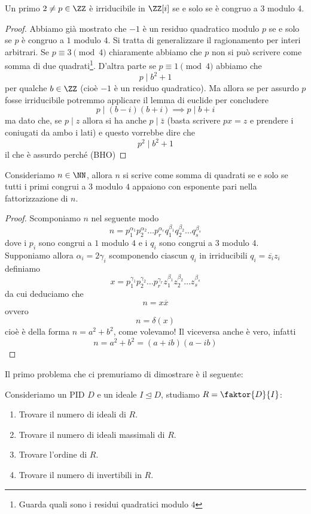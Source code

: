 \documentclass[11pt]{scrartcl}
\newcommand{\normal}{\mathrel{\unlhd}}
\begin{document}
	\begin{proposition}
		Un primo $2\ne p\in\ZZ$ è irriducibile in $\ZZ[i]$ se e solo se è congruo a $3$ modulo $4$.
	\end{proposition}
	\begin{proof}
		Abbiamo già mostrato che $-1$ è un residuo quadratico modulo $p$ se e solo se $p$ è congruo a $1$ modulo $4$. Si tratta di generalizzare il ragionamento per interi arbitrari. Se $p\equiv 3 \pmod{4}$ chiaramente abbiamo che $p$ non si può scrivere come somma di due quadrati\footnote{Guarda quali sono i residui quadratici modulo $4$}. D'altra parte se $p\equiv 1 \pmod{4}$ abbiamo che
		$$p\mid b^2+1$$
		per qualche $b\in\ZZ$ (cioè $-1$ è un residuo quadratico). Ma allora se per assurdo $p$ fosse irriducibile potremmo applicare il lemma di euclide per concludere
		$$p\mid (b-i)(b+i) \implies p\mid b+i$$
		ma dato che, se $p\mid z$ allora si ha anche $p\mid \bar{z}$ (basta scrivere $px=z$ e prendere i coniugati da ambo i lati) e questo vorrebbe dire che 
		$$p^2\mid b^2+1$$
		il che è assurdo perché (BHO)
	\end{proof}
	\begin{proposition}
		Consideriamo $n\in\NN$, allora $n$ si scrive come somma di quadrati se e solo se tutti i primi congrui a $3$ modulo $4$ appaiono con esponente pari nella fattorizzazione di $n$.
	\end{proposition}
	\begin{proof}
		Scomponiamo $n$ nel seguente modo
		$$n=p_1^{\alpha_1}p_2^{\alpha_2}\dots p_r^{\alpha_r}q_1^{\beta_1}q_2^{\beta_2}\dots q_s^{\beta_s}$$
		dove i $p_i$ sono congrui a $1$ modulo $4$ e i $q_i$ sono congrui a $3$ modulo $4$. Supponiamo allora $\alpha_i=2\gamma_i$ scomponendo ciascun $q_i$ in irriducibili $q_i=\overline{z_i}z_i$ definiamo 
		$$x=p_1^{\gamma_1}p_2^{\gamma_2}\dots p_r^{\gamma_r}z_1^{\beta_1}z_2^{\beta_2}\dots z_s^{\beta_s}$$
		da cui deduciamo che 
		$$n=x\overline{x}$$
		ovvero
		$$n=\delta(x)$$
		cioè è della forma $n=a^2+b^2$, come volevamo! Il viceversa anche è vero, infatti
		$$n=a^2+b^2=(a+ib)(a-ib)$$
	\end{proof}
	Il primo problema che ci premuriamo di dimostrare è il seguente:
	\begin{problem}
		Consideriamo un PID $D$ e un ideale $I\normal D$, studiamo $R=\faktor{D}{I}$:
		\begin{enumerate}
			\item Trovare il numero di ideali di $R$.
			\item Trovare il numero di ideali massimali di $R$.
			\item Trovare l'ordine di $R$.
			\item Trovare il numero di invertibili in $R$.
		\end{enumerate}
	\end{problem}
\end{document}
